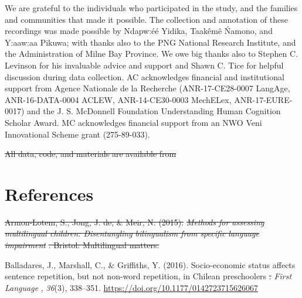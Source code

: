 \documentclass[english,,man,floatsintext]{apa6} %
\providecommand{\DIFaddtex}[1]{{\protect\color{blue}\uwave{#1}}} %
\providecommand{\DIFdeltex}[1]{{\protect\color{red}\sout{#1}}}                      %
\providecommand{\DIFaddbegin}{} %
\providecommand{\DIFaddend}{} %
\providecommand{\DIFdelbegin}{} %
\providecommand{\DIFdelend}{} %
\providecommand{\DIFadd}[1]{\texorpdfstring{\DIFaddtex{#1}}{#1}} %
\providecommand{\DIFdel}[1]{\texorpdfstring{\DIFdeltex{#1}}{}} %
\newcommand{\DIFscaledelfig}{0.5}
\newlength{\DIFdelgraphicswidth} %
\newlength{\DIFdelgraphicsheight} %
\newcommand{\DIFaddincludegraphics}[2][]{{\color{blue}\fbox{\DIFOincludegraphics[#1]{#2}}}} %
\newcommand{\DIFdelincludegraphics}[2][]{%
	\sbox{\DIFdelgraphicsbox}{\DIFOincludegraphics[#1]{#2}}%
	\settoboxwidth{\DIFdelgraphicswidth}{\DIFdelgraphicsbox} %
	\settoboxtotalheight{\DIFdelgraphicsheight}{\DIFdelgraphicsbox} %
	\scalebox{\DIFscaledelfig}{%
		\parbox[b]{\DIFdelgraphicswidth}{\usebox{\DIFdelgraphicsbox}\\[-\baselineskip] \rule{\DIFdelgraphicswidth}{0em}}\llap{\resizebox{\DIFdelgraphicswidth}{\DIFdelgraphicsheight}{%
				\setlength{\unitlength}{\DIFdelgraphicswidth}%
				\begin{picture}(1,1)%
				\thicklines\linethickness{2pt} %
				{\color[rgb]{1,0,0}\put(0,0){\framebox(1,1){}}}%
				{\color[rgb]{1,0,0}\put(0,0){\line( 1,1){1}}}%
				{\color[rgb]{1,0,0}\put(0,1){\line(1,-1){1}}}%
				\end{picture}%
			}\hspace*{3pt}}} %
} %
\DeclareRobustCommand{\DIFaddbegin}{\DIFOaddbegin \let\includegraphics\DIFaddincludegraphics} %
\DeclareRobustCommand{\DIFaddend}{\DIFOaddend \let\includegraphics\DIFOincludegraphics} %
\DeclareRobustCommand{\DIFdelbegin}{\DIFOdelbegin \let\includegraphics\DIFdelincludegraphics} %
\DeclareRobustCommand{\DIFdelend}{\DIFOaddend \let\includegraphics\DIFOincludegraphics} %
\begin{document}
We are grateful to the individuals who participated in the study, and the families and communities that made it possible. The collection and annotation of these recordings was made possible by Ndapw:éé Yidika, Taakêmê Ńamono, and Y:aaw:aa Pikuwa; with thanks also to the PNG National Research Institute, and the Administration of Milne Bay Province. We owe big thanks also to Stephen C. Levinson for his invaluable advice and support and Shawn C. Tice for helpful discussion during data collection. AC acknowledges financial and institutional support from Agence Nationale de la Recherche (ANR-17-CE28-0007 LangAge, ANR-16-DATA-0004 ACLEW, ANR-14-CE30-0003 MechELex, ANR-17-EURE-0017) and the J. S. McDonnell Foundation Understanding Human Cognition Scholar Award. MC acknowledges financial support from an NWO Veni Innovational Scheme grant (275-89-033).

\DIFdelbegin %

\DIFdel{All data, code, and materials are available from }%

\DIFdelend \hypertarget{references}{%
	\section{References}\label{references}}

\setlength{\parindent}{-0.5in}
\setlength{\leftskip}{0.5in}

\hypertarget{refs}{}
\DIFdelbegin %
\DIFdelend \leavevmode\DIFdelbegin %
\DIFdel{Armon-Lotem, S., Jong, J. de, \& Meir, N. (2015). }\emph{\DIFdel{Methods for assessing multilingual children: Disentangling bilingualism from specific language impairment}}%
\DIFdel{. Bristol: Multilingual matters.
}%

\DIFdelend \hypertarget{ref-balladares2016socio}{}%
Balladares, J., Marshall, C., \& Griffiths, Y. (2016). \DIFdelbegin %
\DIFdelend Socio-economic status affects sentence repetition, but not non-word repetition, in Chilean preschoolers\DIFdelbegin %
\DIFdel{. }\DIFdelend \DIFaddbegin \DIFadd{. }\DIFaddend \emph{\DIFdelbegin %
	\DIFdelend First Language\DIFdelbegin %
	\DIFdelend }, \emph{36}(3), 338--351. \url{https://doi.org/10.1177/0142723715626067}
\end{document}
